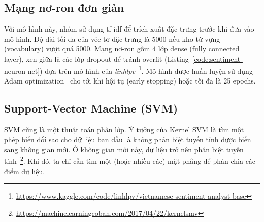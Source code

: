 \subsection{Mạng nơ-ron đơn giản}
Với mô hình này, nhóm sử dụng \acrshort{tf-idf} để trích xuất đặc trưng trước khi đưa vào mô hình. Độ dài tối đa của véc-tơ đặc trưng là 5000 nếu kho từ vựng (vocabulary) vượt quá 5000. Mạng nơ-ron gồm 4 lớp dense (fully connected layer), xen giữa là các lớp dropout để tránh overfit (Listing~\ref{code:sentiment-neuron-net}) dựa trên mô hình của \textit{linhlpv}~\footnote{\url{https://www.kaggle.com/code/linhlpv/vietnamese-sentiment-analyst-base}}. Mô hình được huấn luyện sử dụng Adam optimization~\cite{kingmaAdamMethodStochastic2017} cho tới khi hội tụ (early stopping) hoặc tối đa là 25 epochs.


\subsection{Support-Vector Machine (SVM)}
\acrshort{SVM} cũng là một thuật toán phân lớp. Ý tưởng của Kernel SVM là tìm một phép biến đổi sao cho dữ liệu ban đầu là không phân biệt tuyến tính được biến sang không gian mới. Ở không gian mới này, dữ liệu trở nên phân biệt tuyến tính~\footnote{\url{https://machinelearningcoban.com/2017/04/22/kernelsmv}}. Khi đó, ta chỉ cần tìm một (hoặc nhiều các) mặt phẳng để phân chia các điểm dữ liệu.


